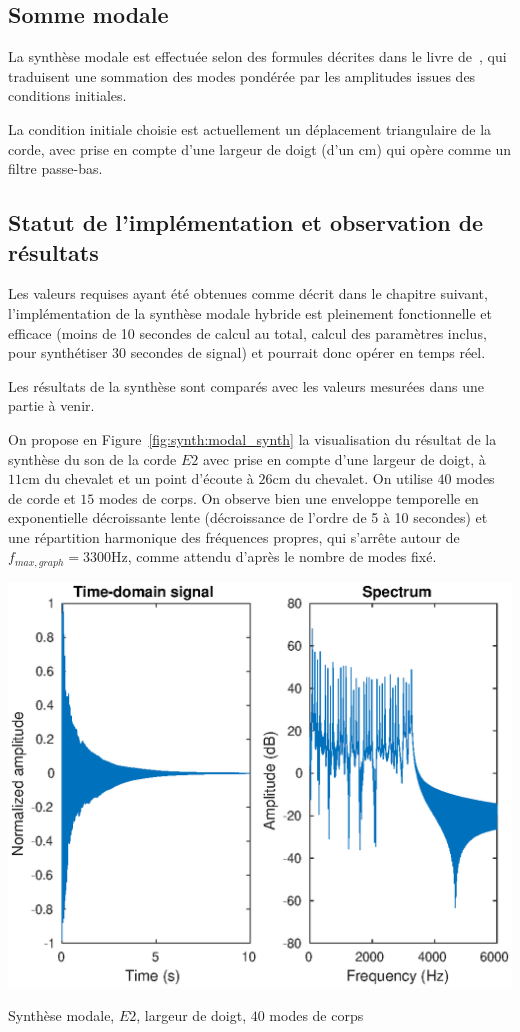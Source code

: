 \subsection{Somme modale}

  La synthèse modale est effectuée selon des formules décrites
dans le livre de~\textcite{newland}, qui traduisent une sommation des modes
pondérée par les amplitudes issues des conditions initiales.

  La condition initiale choisie est actuellement un déplacement triangulaire
de la corde, avec prise en compte d'une largeur de doigt (d'un \( \si{\cm} \))
qui opère comme un filtre passe-bas.

\subsection{Statut de l'implémentation et observation de résultats}

Les valeurs requises ayant été obtenues comme décrit dans le chapitre suivant,
l'implémentation de la synthèse modale hybride est pleinement fonctionnelle
et efficace (moins de 10 secondes de calcul au total, calcul des paramètres
inclus, pour synthétiser 30 secondes de signal) et pourrait donc opérer en
temps réel.

Les résultats de la synthèse sont comparés avec les valeurs mesurées dans une
partie à venir.

On propose en Figure~\ref{fig:synth:modal_synth} la visualisation du résultat
de la synthèse du son de la corde \( E2 \) avec prise en compte d'une largeur
de doigt, à \( \si{11\cm} \) du chevalet et un point d'écoute à
\( \si{26\cm} \) du chevalet.
On utilise \( 40 \) modes de corde et \( 15 \) modes de corps.
On observe bien une enveloppe temporelle en exponentielle décroissante lente
(décroissance de l'ordre de 5 à 10 secondes) et une répartition harmonique
des fréquences propres, qui s'arrête autour de
\( f_{max, graph} = \si{3300\Hz} \), comme attendu d'après le nombre de modes
fixé.

\begin{table}[hpbt]
\centering
\includegraphics[scale=0.8]{figures/modal_synthesis-E2-40_string_modes-15_body_modes-finger_pluck.eps}
 \caption{Synthèse modale, \( E2 \), largeur de doigt, \( 40 \) modes de corps
 \label{fig:synth:modal_synth}}
\end{table}

% 
